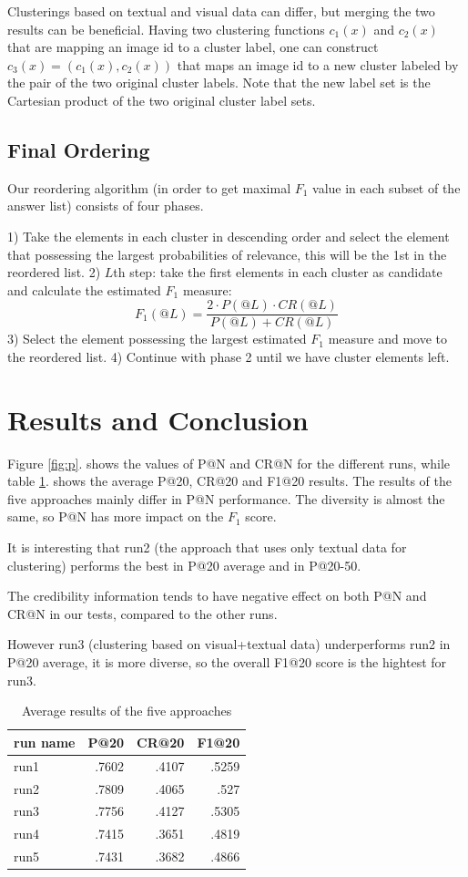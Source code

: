 \documentclass{acm_proc_article-me}
\begin{document}
Clusterings based on textual and visual data can differ, but merging the two results can be beneficial. Having two clustering functions $c_1(x)$ and $c_2(x)$ that are mapping an image id to a cluster label, one can construct $c_3(x) = (c_1(x), c_2(x))$ that maps an image id to a new cluster labeled by the pair of the two original cluster labels. Note that the new label set is the Cartesian product of the two original cluster label sets.

\subsection{Final Ordering}

Our reordering algorithm (in order to get maximal $F_1$ value in each subset of the answer list) consists of four phases.

1) Take the elements in each cluster in descending order and select the element that possessing the largest probabilities of relevance, this will be the 1st in the reordered list.
2) $L$th step: take the first elements in each cluster as candidate and calculate the estimated $F_1$ measure: $$F_1(@L) = \frac{2 \cdot P(@L) \cdot CR(@L)}{P(@L) + CR(@L)}$$
3) Select the element possessing the largest estimated $F_1$ measure and move to the reordered list.
4) Continue with phase 2 until we have cluster elements left.

\section{Results and Conclusion}

Figure \ref{fig:p}. shows the values of P@N and CR@N for the different runs, while table \ref{table:results}. shows the average P@20, CR@20 and F1@20 results. The results of the five approaches mainly differ in P@N performance. The diversity is almost the same, so P@N has more impact on the $F_1$ score.

It is interesting that run2 (the approach that uses only textual data for clustering) performs the best in P@20 average and in P@20-50.

The credibility information tends to have negative effect on both P@N and CR@N in our tests, compared to the other runs.

However run3 (clustering based on visual+textual data) underperforms run2 in P@20 average, it is more diverse, so the overall F1@20 score is the hightest for run3.

\begin{table}[h]
\centering
\begin{tabular}{|l|r|r|r|}
	\hline 
	run name & P@20 & CR@20 & F1@20\tabularnewline
	\hline 
	\hline 
	run1 & .7602 & .4107 & .5259\tabularnewline
	\hline 
	run2 & .7809 & .4065 & .527\tabularnewline
	\hline 
	run3 & .7756 & .4127 & .5305\tabularnewline
	\hline 
	run4 & .7415 & .3651 & .4819\tabularnewline
	\hline 
	run5 & .7431 & .3682 & .4866\tabularnewline
	\hline 
\end{tabular}
\caption{Average results of the five approaches}
\label{table:results}
\end{table}
\end{document}
